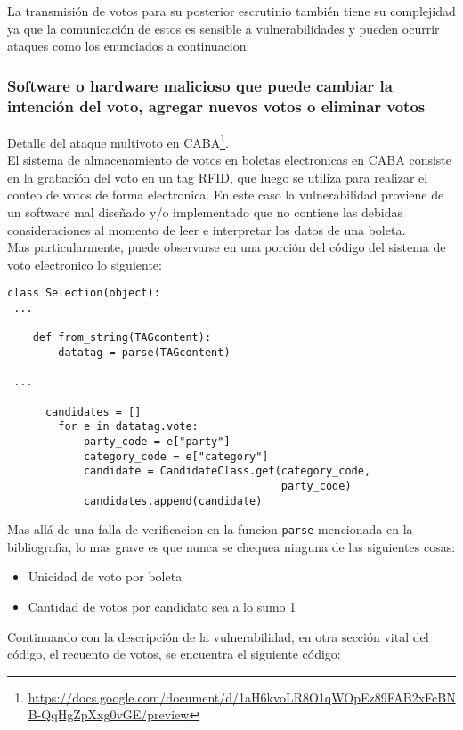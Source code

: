 La transmisión de votos para su posterior escrutinio también tiene su complejidad ya que la comunicación de estos es sensible a vulnerabilidades y pueden ocurrir ataques como los enunciados a continuacion:

\subsubsection{Software o hardware malicioso que puede cambiar la intención del voto, agregar nuevos votos o eliminar votos}	
Detalle del ataque multivoto en CABA\footnote{\url{https://docs.google.com/document/d/1aH6kvoLR8O1qWOpEz89FAB2xFcBNB-QqHgZpXxg0vGE/preview}}.\\

El sistema de almacenamiento de votos en boletas electronicas en CABA consiste en la grabación del voto en un tag RFID, que luego se utiliza para realizar el conteo de votos de forma electronica. En este caso la vulnerabilidad proviene de un software mal diseñado y/o implementado que no contiene las debidas consideraciones al momento de leer e interpretar los datos de una boleta.\\

Mas particularmente, puede observarse en una porción del código del sistema de voto electronico lo siguiente:

\begin{lstlisting}
class Selection(object):
 ...

    def from_string(TAGcontent):
        datatag = parse(TAGcontent)

 ...
 
      candidates = []
        for e in datatag.vote:
            party_code = e["party"]
            category_code = e["category"]
            candidate = CandidateClass.get(category_code,
                                           party_code)
            candidates.append(candidate)

\end{lstlisting}

Mas allá de una falla de verificacion en la funcion \texttt{parse} mencionada en la bibliografia, lo mas grave es que nunca se chequea ninguna de las siguientes cosas:
\begin{itemize}
	\item Unicidad de voto por boleta
	\item Cantidad de votos por candidato sea a lo sumo 1
\end{itemize} 

Continuando con la descripción de la vulnerabilidad, en otra sección vital del código, el recuento de votos, se encuentra el siguiente código:

